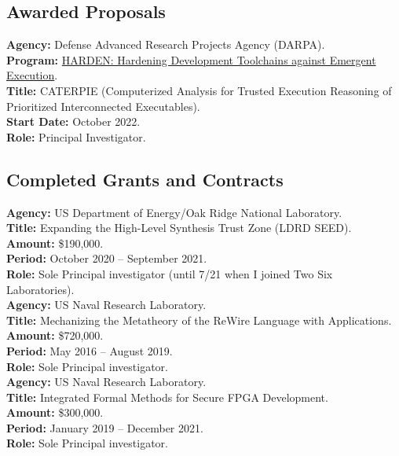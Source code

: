\documentclass[12pt]{article} %
\begin{document}
\subsection*{Awarded Proposals}

{\bf Agency:} Defense Advanced Research Projects Agency (DARPA).
\\
{\bf Program:} \href{https://www.darpa.mil/news-events/2021-09-22}{HARDEN: Hardening Development Toolchains against Emergent Execution}.
\\
{\bf Title:} CATERPIE (Computerized Analysis for Trusted Execution Reasoning of Prioritized Interconnected Executables).
\\
{\bf Start Date:} October 2022.
\\
{\bf Role:} Principal Investigator.

\subsection*{Completed Grants and Contracts}

{\bf Agency:} US Department of Energy/Oak Ridge National Laboratory.
\\
{\bf Title:} Expanding the High-Level Synthesis Trust Zone (LDRD SEED).
\\
{\bf Amount:} \$190,000.
\\
{\bf Period:}   October 2020  --  September 2021.
\\
{\bf Role:}    Sole Principal investigator (until 7/21 when I joined Two Six Laboratories).
\\

{\bf Agency:} US Naval Research Laboratory.
\\
{\bf Title:} Mechanizing the Metatheory of the ReWire Language with Applications.
\\
{\bf Amount:} \$720,000.
\\
{\bf Period:}   May 2016  --  August 2019.
\\
{\bf Role:}    Sole  Principal investigator.
\\

{\bf Agency:} US Naval Research Laboratory.
\\
{\bf Title:} Integrated Formal Methods for Secure FPGA Development.
\\
{\bf Amount:} \$300,000.
\\
{\bf Period:}   January 2019  --  December 2021.
\\
{\bf Role:}    Sole  Principal investigator.
\\
\end{document}
